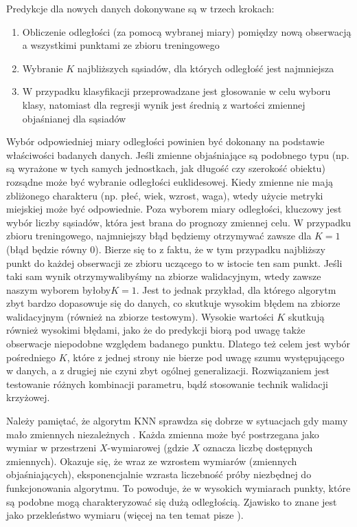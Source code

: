 \documentclass[12pt,a4paper,twoside,openany]{book}
\begin{document}
Predykcje dla nowych danych dokonywane są w trzech krokach:
\begin{enumerate}
\item Obliczenie odległości (za pomocą wybranej miary) pomiędzy nową obserwacją a wszystkimi punktami ze zbioru treningowego
\item Wybranie $K$ najbliższych sąsiadów, dla których odległość jest najmniejsza
\item W przypadku klasyfikacji przeprowadzane jest głosowanie w celu wyboru klasy, natomiast dla regresji wynik jest średnią z wartości zmiennej objaśnianej dla sąsiadów
\end{enumerate}

Wybór odpowiedniej miary odległości powinien być dokonany na podstawie właściwości badanych danych. Jeśli zmienne objaśniające są podobnego typu (np. są wyrażone w tych samych jednostkach, jak długość czy szerokość obiektu) rozsądne może być wybranie odległości euklidesowej. Kiedy zmienne nie mają zbliżonego charakteru (np. płeć, wiek, wzrost, waga), wtedy użycie metryki miejskiej może być odpowiednie. Poza wyborem miary odległości, kluczowy jest wybór liczby sąsiadów, która jest brana do prognozy zmiennej celu. W przypadku zbioru treningowego, najmniejszy błąd będziemy otrzymywać zawsze dla $K = 1$ (błąd będzie równy 0). Bierze się to z faktu, że w tym przypadku najbliższy punkt do każdej obserwacji ze zbioru uczącego to w istocie ten sam punkt. Jeśli taki sam wynik otrzymywalibyśmy na zbiorze walidacyjnym, wtedy zawsze naszym wyborem byłoby$K = 1$. Jest to jednak przykład, dla którego algorytm zbyt bardzo dopasowuje się do danych, co skutkuje wysokim błędem na zbiorze walidacyjnym (również na zbiorze testowym). Wysokie wartości $K$ skutkują również wysokimi błędami, jako że do predykcji biorą pod uwagę także obserwacje niepodobne względem badanego punktu. Dlatego też celem jest wybór pośredniego $K$, które z jednej strony nie bierze pod uwagę szumu występującego w danych, a z drugiej nie czyni zbyt ogólnej generalizacji. Rozwiązaniem jest testowanie różnych kombinacji parametru, bądź stosowanie technik walidacji krzyżowej.

Należy pamiętać, że algorytm KNN sprawdza się dobrze w sytuacjach gdy mamy mało zmiennych niezależnych \citep{indyk1998}. Każda zmienna może być postrzegana jako wymiar w przestrzeni $X$-wymiarowej (gdzie $X$ oznacza liczbę dostępnych zmiennych). Okazuje się, że wraz ze wzrostem wymiarów (zmiennych objaśniających), eksponencjalnie wzrasta liczebność próby niezbędnej do funkcjonowania algorytmu. To powoduje, że w wysokich wymiarach punkty, które są podobne mogą charakteryzować się dużą odległością. Zjawisko to znane jest jako przekleństwo wymiaru (więcej na ten temat pisze \citet{hastie2009}).
\end{document}
